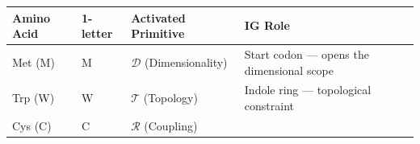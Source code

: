 \documentclass[12pt,a4paper]{article}
\begin{document}
\begin{longtable}[]{@{}llll@{}}
\toprule
\begin{minipage}[b]{0.20\columnwidth}\raggedright
Amino Acid\strut
\end{minipage} & \begin{minipage}[b]{0.17\columnwidth}\raggedright
1-letter\strut
\end{minipage} & \begin{minipage}[b]{0.36\columnwidth}\raggedright
Activated Primitive\strut
\end{minipage} & \begin{minipage}[b]{0.15\columnwidth}\raggedright
IG Role\strut
\end{minipage}\tabularnewline
\midrule
\endhead
\begin{minipage}[t]{0.20\columnwidth}\raggedright
Met (M)\strut
\end{minipage} & \begin{minipage}[t]{0.17\columnwidth}\raggedright
M\strut
\end{minipage} & \begin{minipage}[t]{0.36\columnwidth}\raggedright
\(\mathcal{D}\) (Dimensionality)\strut
\end{minipage} & \begin{minipage}[t]{0.15\columnwidth}\raggedright
Start codon --- opens the dimensional scope\strut
\end{minipage}\tabularnewline
\begin{minipage}[t]{0.20\columnwidth}\raggedright
Trp (W)\strut
\end{minipage} & \begin{minipage}[t]{0.17\columnwidth}\raggedright
W\strut
\end{minipage} & \begin{minipage}[t]{0.36\columnwidth}\raggedright
\(\mathcal{T}\) (Topology)\strut
\end{minipage} & \begin{minipage}[t]{0.15\columnwidth}\raggedright
Indole ring --- topological constraint\strut
\end{minipage}\tabularnewline
\begin{minipage}[t]{0.20\columnwidth}\raggedright
Cys (C)\strut
\end{minipage} & \begin{minipage}[t]{0.17\columnwidth}\raggedright
C\strut
\end{minipage} & \begin{minipage}[t]{0.36\columnwidth}\raggedright
\(\mathcal{R}\) (Coupling)\strut

\end{minipage}
\end{longtable}
\end{document}
